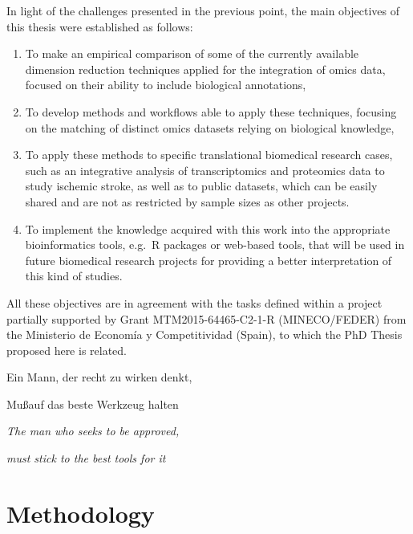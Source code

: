 \documentclass[a4paper, nobind]{templates/ociamthesis}
\begin{document}
In light of the challenges presented in the previous point, the main objectives of this thesis were established as follows:

\begin{enumerate}
\def\labelenumi{\arabic{enumi}.}
\item
  To make an empirical comparison of some of the currently available dimension reduction techniques applied for the integration of omics data, focused on their ability to include biological annotations,
\item
  To develop methods and workflows able to apply these techniques, focusing on the matching of distinct omics datasets relying on biological knowledge,
\item
  To apply these methods to specific translational biomedical research cases, such as an integrative analysis of transcriptomics and proteomics data to study ischemic stroke, as well as to public datasets, which can be easily shared and are not as restricted by sample sizes as other projects.
\item
  To implement the knowledge acquired with this work into the appropriate bioinformatics tools, e.g.~R packages or web-based tools, that will be used in future biomedical research projects for providing a better interpretation of this kind of studies.
\end{enumerate}

\begin{small}All these objectives are in agreement with the tasks defined within a project partially supported by Grant MTM2015-64465-C2-1-R (MINECO/FEDER) from the Ministerio de Economía y Competitividad (Spain), to which the PhD Thesis proposed here is related.\end{small}

\begin{savequote}
Ein Mann, der recht zu wirken denkt,

Mu\ss\enspace auf das beste Werkzeug halten

\emph{The man who seeks to be approved,}

\emph{must stick to the best tools for it}
\end{savequote}



\hypertarget{methods}{%
\chapter{Methodology}\label{methods}}
\end{document}
